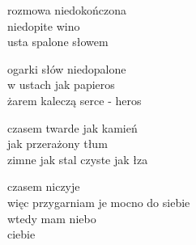 \begin{text}
    rozmowa niedokończona\\
    niedopite wino\\
    usta spalone słowem

    ogarki słów niedopalone\\
    w ustach jak papieros\\
    żarem kaleczą serce - heros

    czasem twarde jak kamień\\
    jak przerażony tłum\\
    zimne jak stal czyste jak łza

    czasem niczyje\\
    więc przygarniam je mocno do siebie\\
    wtedy mam niebo\\
    ciebie
\end{text}
\begin{chord}

\end{chord}